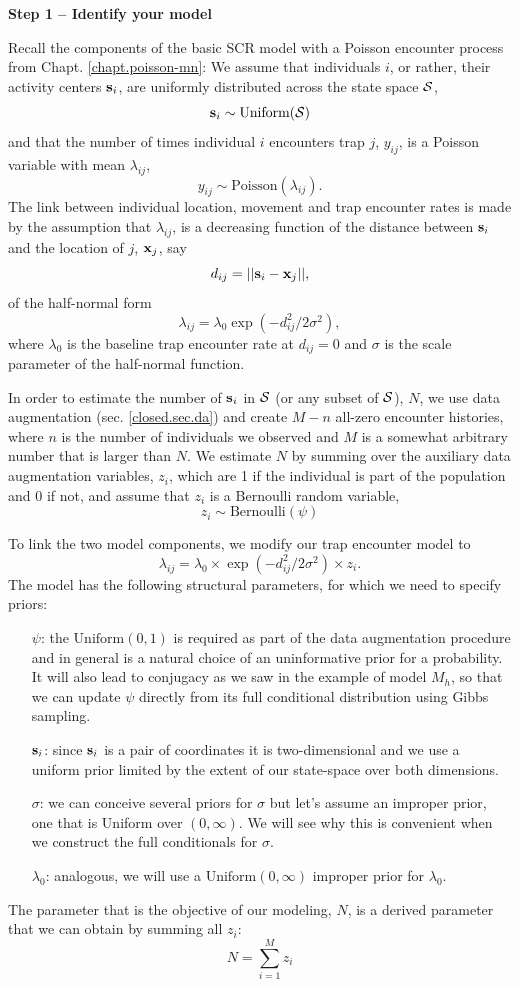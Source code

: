 {\bf Step 1 -- Identify your model}

Recall the components of the basic SCR model with a Poisson encounter process from Chapt. \ref{chapt.poisson-mn}:
We assume that individuals $i$, or rather, their activity centers
${\bf s}_i$, are uniformly distributed across the state space ${\cal S}$,
\[
{\bf s}_i  \sim \mbox{Uniform}({\cal S})
\]
and that the number of times individual $i$ encounters trap $j$, $y_{ij}$, is a Poisson variable with mean $\lambda_{ij}$,
\[
y_{ij} \sim \mbox{Poisson}(\lambda_{ij}).
\]
The link between individual location, movement and trap encounter
rates is made by the assumption that $\lambda_{ij}$, is a decreasing
function of the distance between ${\bf s}_i$ and the location of $j$,
${\bf x}_{j}$, say 
\[
d_{ij} = ||{\bf s}_{i} - {\bf x}_{j}||,
\]
of the half-normal form
\[
\lambda_{ij} =  \lambda_0  \exp(-d_{ij}^2/2\sigma^2),
\]
where $\lambda_0$ is the baseline trap encounter rate at $d_{ij}=0$ and $\sigma$ is the scale parameter of the half-normal function.

In order to estimate the number of ${\bf s}_i$ in ${\cal S}$ (or any
subset of ${\cal S}$), $N$, we use data augmentation (sec. \ref{closed.sec.da}) and create $M-n$ all-zero encounter histories, where $n$ is the number of individuals we observed and $M$ is a somewhat arbitrary number that is larger than $N$. We estimate $N$ by summing over the auxiliary data augmentation variables, $z_i$, which are 1 if the individual is part of the population and 0 if not, and assume that $z_i$ is a Bernoulli random variable,
\[
z_{i} \sim \mbox{Bernoulli}(\psi)
\]

To link the two model components, we modify our trap encounter model to
\[
\lambda_{ij} = \lambda_0 \times \exp(-d_{ij}^2/2\sigma^2) \times z_{i}.
\]
The model has the following structural parameters, for which we need to specify priors:
\begin{itemize}
\item[ $\psi$:] the $\mbox{Uniform}(0,1)$ is required as part of the data augmentation procedure and in general is a natural choice of an uninformative prior for a probability. It will also lead to conjugacy as we saw in the example of model $M_h$, so that we can update $\psi$ directly from its full conditional distribution using Gibbs sampling.
\item[ ${\bf s}_{i}$:] since ${\bf s}_{i}$ is a pair of coordinates it is two-dimensional and we use a uniform prior limited by the extent of our state-space over both dimensions.
\item[ $\sigma$:] we can conceive several priors for $\sigma$ but let's assume an improper prior, one that is Uniform over $(0, \infty)$. We will see why this is convenient when we construct the full conditionals for $\sigma$.
\item[ $\lambda_{0}$:] analogous, we will use a $\mbox{Uniform}(0, \infty)$ improper prior for $\lambda_{0}$.
\end{itemize}
The parameter that is the objective of our modeling, $N$, is a derived parameter that we can obtain by summing all $z_i$:
\[
N = \sum_{i=1}^{M} z_{i}
\]

